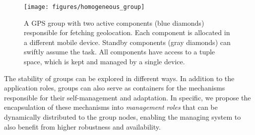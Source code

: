 \begin{figure}[t!]
	\centering
	\texttt{[image: figures/homogeneous\_group]}
	\caption{A GPS group with two active components (blue diamonds) responsible for fetching geolocation. Each component is allocated in a different mobile device. Standby components (gray diamonds) can swiftly assume the task. All components have access to a tuple space, which is kept and managed by a single device.}
	\label{fig:homogeneous_group}
\end{figure}









The stability of groups can be explored in different ways. In addition to the application roles, groups can also serve as containers for the mechanisms responsible for their self-management and adaptation. In specific, we propose the encapsulation of these mechanisms into \textit{management roles} that can be dynamically distributed to the group nodes, enabling the managing system to also benefit from higher robustness and availability.


